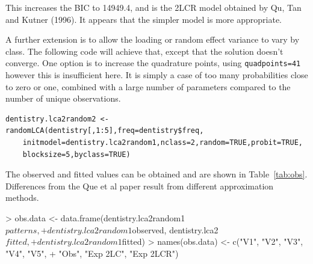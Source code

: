 \documentclass[a4paper]{article}
\begin{document}
\begin{Schunk}
\end{Schunk}

This increases the BIC to 14949.4, and is the 2LCR model obtained by Qu, Tan and Kutner (1996). It appears that the simpler model is more appropriate.

A further extension is to allow the loading or random effect variance to vary by class. The following code will achieve that, except that the solution doesn't converge. One option is to increase the quadrature points, using \texttt{quadpoints=41} however this is insufficient here. It is simply a case of too many probabilities close to zero or one, combined with a large number of parameters compared to the number of unique observations.


\begin{verbatim}
dentistry.lca2random2 <- randomLCA(dentistry[,1:5],freq=dentistry$freq,
	initmodel=dentistry.lca2random1,nclass=2,random=TRUE,probit=TRUE,
	blocksize=5,byclass=TRUE)
\end{verbatim}


The observed and fitted values can be obtained and are shown in Table~\ref{tab:obs}. Differences from the Que et al paper result from different approximation methods.

\begin{Schunk}
\begin{Sinput}
> obs.data <- data.frame(dentistry.lca2random1$patterns, 
+     dentistry.lca2random1$observed, dentistry.lca2$fitted, 
+     dentistry.lca2random1$fitted)
> names(obs.data) <- c("V1", "V2", "V3", "V4", "V5", 
+     "Obs", "Exp 2LC", "Exp 2LCR")
\end{Sinput}
\end{Schunk}
\end{document}
